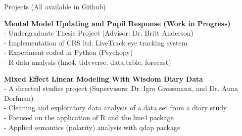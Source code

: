 \documentclass{resume} %
\begin{document}
\begin{rSection}{Projects (All available in Github)}

{\bf Mental Model Updating and Pupil Response (Work in Progress)}
\\- Undergraduate Thesis Project (Advisor: Dr. Britt Anderson)
\\- Implementation of CRS ltd. LiveTrack eye tracking system
\\- Experiment coded in Python (Psychopy)
\\- R data analysis (lme4, tidyverse, data.table, forecast)

{\bf Mixed Effect Linear Modeling With Wisdom Diary Data}
\\- A directed studies project (Supervisors: Dr. Igro Grossmann, and Dr. Anna Dorfman)
\\- Cleaning and exploratory data analysis of a data set from a diary study
\\- Focused on the application of R and the lme4 package
\\- Applied semantics (polarity) analysis with qdap package



\end{rSection}
\end{document}
